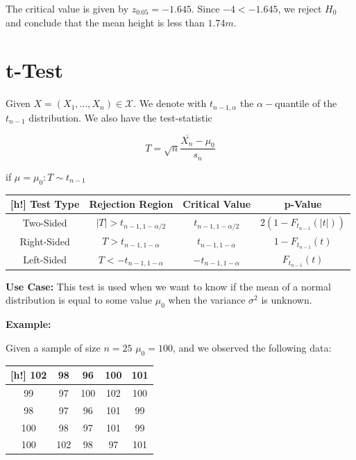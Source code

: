 The critical value is given by \(z_{0.05} = -1.645\). Since \(-4 < -1.645\), we reject \(H_0\) and conclude that the mean height is less than \(1.74m\).

\section{t-Test}

Given \(X = (X_1, \dots, X_n) \in \mathcal{X}\). We denote with \(t_{n - 1, \alpha}\) the \(\alpha-\)quantile of 
the \(t_{n - 1}\) distribution. We also have the test-statistic

\[
    T = \sqrt{n} \frac{\overline{X_n} - \mu_0}{s_n}
\]

if \(\mu = \mu_0: T \sim t_{n - 1}\) 

\begin{center} 
    \begin{tabular}{c|c|c|c}[h!]
        Test Type & Rejection Region & Critical Value & p-Value \\ \hline
        Two-Sided & \(|T| > t_{n - 1, 1 - \alpha/2}\) & \(t_{n - 1, 1 - \alpha/2}\) & \(2(1 - F_{t_{n - 1}}(|t|))\) \\ \hline
        Right-Sided & \(T > t_{n - 1, 1 - \alpha}\) & \(t_{n - 1, 1 - \alpha}\) & \(1 - F_{t_{n - 1}}(t)\) \\ \hline
        Left-Sided & \(T < -t_{n - 1, 1 - \alpha}\) & \(-t_{n - 1, 1 - \alpha}\) & \(F_{t_{n - 1}}(t)\)
    \end{tabular}
\end{center}

\textbf{Use Case:} This test is used when we want to know if the mean of a normal distribution is equal to some value \(\mu_0\) 
when the variance \(\sigma^2\) is unknown.

\textbf{Example:}

Given a sample of size \(n = 25\) \(\mu_0 = 100\), and we observed the following data:

\begin{center}
    \begin{tabular}{|c|c|c|c|c|}[h!]
        102 & 98 & 96 & 100 & 101 \\ \hline
        99 & 97 & 100 & 102 & 100 \\ \hline
        98 & 97 & 96 & 101 & 99 \\ \hline
        100 & 98 & 97 & 101 & 99 \\ \hline
        100 & 102 & 98 & 97 & 101 \\ \hline
    \end{tabular}
\end{center}

